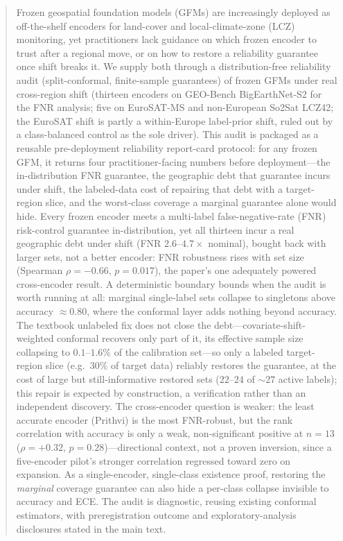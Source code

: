 \documentclass[journal]{IEEEtran}
\renewcommand{\_}{\textunderscore\allowbreak}
\begin{document}
\begin{abstract}
Frozen geospatial foundation models (GFMs) are increasingly deployed as off-the-shelf encoders for
land-cover and local-climate-zone (LCZ) monitoring, yet practitioners lack guidance on which frozen
encoder to trust after a regional move, or on how to restore a reliability guarantee once shift breaks
it. We supply both through a distribution-free reliability audit (split-conformal, finite-sample
guarantees) of frozen GFMs under real cross-region shift (thirteen encoders on GEO-Bench BigEarthNet-S2
for the FNR analysis; five on EuroSAT-MS and non-European So2Sat LCZ42; the EuroSAT
shift is partly a within-Europe label-prior shift, ruled out by a class-balanced control as the sole
driver). This audit is packaged as a reusable pre-deployment reliability report-card protocol:
for any frozen GFM, it returns four practitioner-facing numbers before
deployment---the in-distribution FNR guarantee, the geographic debt that guarantee incurs under shift,
the labeled-data cost of repairing that debt with a target-region slice, and the worst-class coverage a
marginal guarantee alone would hide. Every frozen encoder meets a multi-label false-negative-rate (FNR) risk-control guarantee
in-distribution, yet all thirteen incur a real geographic debt under shift (FNR $2.6$--$4.7\times$
nominal), bought back with larger sets, not a better encoder: FNR robustness rises with set size (Spearman
$\rho=-0.66$, $p{=}0.017$), the paper's one adequately powered cross-encoder result. A deterministic
boundary bounds when the audit is worth running at all: marginal single-label sets collapse to singletons
above accuracy $\approx0.80$, where the conformal layer adds nothing beyond accuracy. The textbook
unlabeled fix does not close the debt---covariate-shift-weighted conformal recovers only part of it, its
effective sample size collapsing to $0.1$--$1.6\%$ of the calibration set---so only a labeled
target-region slice (e.g.\ $30\%$ of target data) reliably restores the guarantee, at the cost of large
but still-informative restored sets ($22$--$24$ of ${\sim}27$ active labels); this repair is expected by
construction, a verification rather than an independent discovery. The cross-encoder question is weaker:
the least accurate encoder (Prithvi) is the most FNR-robust, but the rank correlation with accuracy is
only a weak, non-significant positive at $n{=}13$ ($\rho=+0.32$, $p{=}0.28$)---directional context, not a
proven inversion, since a five-encoder pilot's stronger correlation regressed toward zero on expansion.
As a single-encoder, single-class existence proof, restoring the \emph{marginal} coverage guarantee can
also hide a per-class collapse invisible to accuracy and ECE. The audit is diagnostic, reusing existing
conformal estimators, with preregistration outcome and exploratory-analysis disclosures stated in the main text.
\end{abstract}
\end{document}
